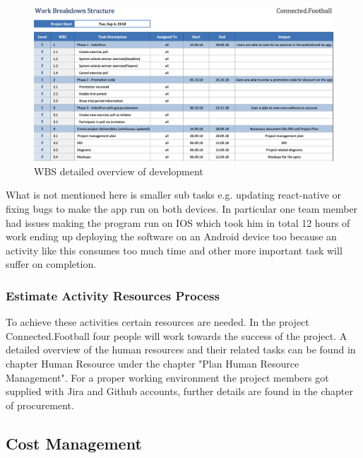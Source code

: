 \begin{figure}[H]
  \includegraphics[width=\linewidth]{images/diagrams/wbs_detailed.png}
  \caption{WBS detailed overview of development}
\end{figure}

What is not mentioned here is smaller sub tasks e.g. updating react-native or fixing bugs to make the app run on both devices. In particular one team member had issues making the program run on IOS which took him in total 12 hours of work ending up deploying the software on an Android device too because an activity like this consumes too much time and other more important task will suffer on completion.

\subsubsection{Estimate Activity Resources Process}
\label{sssec:estimate_activity_resources_process}

To achieve these activities certain resources are needed. In the project Connected.Football four people will work towards the success of the project. A detailed overview of the human resources and their related tasks can be found in chapter Human Resource under the chapter "Plan Human Resource Management". For a proper working environment the project members got supplied with Jira and Github accounts, further details are found in the chapter of procurement.



\subsection{Cost Management}
\label{ssec:cost_management}

